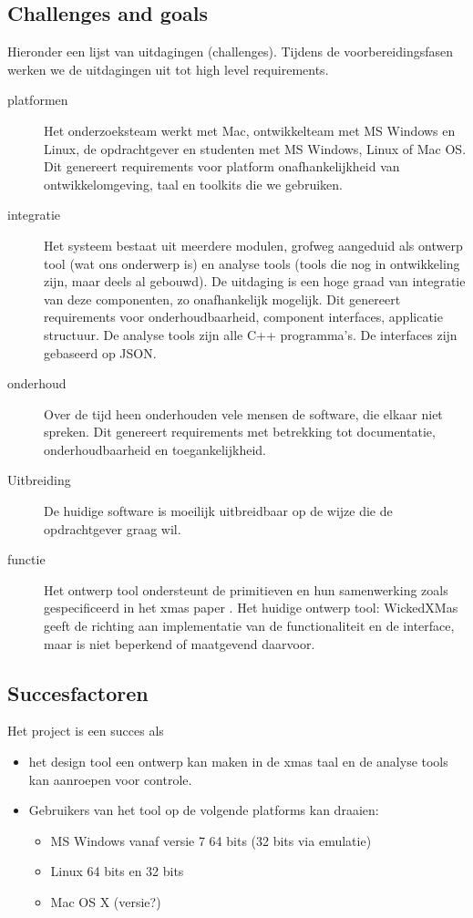 \subsection{Challenges and goals}\label{sec: challenges goals}

Hieronder een lijst van uitdagingen (challenges). Tijdens de voorbereidingsfasen werken we de uitdagingen uit tot high level requirements.

\begin{description}
 \item[platformen] Het onderzoeksteam werkt met Mac, ontwikkelteam met MS Windows en Linux, de opdrachtgever en studenten met MS Windows, Linux of Mac OS.
		    Dit genereert requirements voor platform onafhankelijkheid van ontwikkelomgeving, taal en toolkits die we gebruiken.
 \item[integratie] Het systeem bestaat uit meerdere modulen, grofweg aangeduid als ontwerp tool (wat ons onderwerp is) en analyse tools (tools die nog
		    in ontwikkeling zijn, maar deels al gebouwd). De uitdaging is een hoge graad van integratie van deze componenten, zo onafhankelijk mogelijk.
		    Dit genereert requirements voor onderhoudbaarheid, component interfaces, applicatie structuur. De analyse tools zijn alle C++ programma's.
		    De interfaces zijn gebaseerd op JSON.
 \item[onderhoud] Over de tijd heen onderhouden vele mensen de software, die elkaar niet spreken. Dit genereert requirements met betrekking tot documentatie,
		    onderhoudbaarheid en toegankelijkheid.
 \item[Uitbreiding] De huidige software is moeilijk uitbreidbaar op de wijze die de opdrachtgever graag wil.
 \item[functie] Het ontwerp tool ondersteunt de primitieven en hun samenwerking zoals gespecificeerd in het xmas paper \cite{chatterjee-kishinevsky:xmas}.
		Het  huidige ontwerp tool: WickedXMas geeft de richting aan implementatie van de functionaliteit en de interface, maar is
		niet beperkend of maatgevend daarvoor.
\end{description}


\subsection{Succesfactoren}
Het project is een succes als

\begin{itemize}
 \item het design tool een ontwerp kan maken in de xmas taal en de analyse tools kan aanroepen voor controle.
 \item Gebruikers van het tool op de volgende platforms kan draaien:
 \begin{itemize}
    \item MS Windows vanaf versie 7 64 bits (32 bits via emulatie)
    \item Linux 64 bits en 32 bits
    \item Mac OS X (versie?)
 \end{itemize}
\end{itemize}

